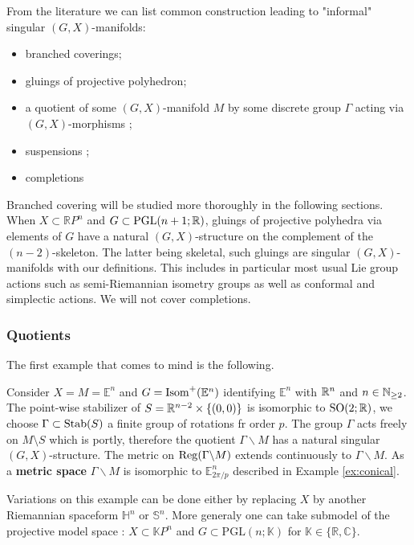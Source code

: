 From the literature we can list common construction leading to "informal" singular $(G,X)$-manifolds:
\begin{itemize}

 \item branched coverings;
 \item gluings of projective polyhedron; \cite{MR2127379,MR2170277,Particules_2,brunswic2021cauchy,spinexp}
  \item a quotient of some $(G,X)$-manifold $M$ by some discrete group $\Gamma$ acting via $(G,X)$-morphisms \cite{MR1177168};
 \item suspensions \cite{MR1668340,Particules_1};
 \item completions \cite{brunswic2021cauchy} 
\end{itemize}

Branched covering will be studied more thoroughly in the following sections. When $X\subset \mathbb RP^n$ and $G\subset \mathrm{PGL}(n+1; \mathbb R)$, gluings of projective polyhedra via elements of $G$ have a natural $(G,X)$-structure on the complement of the $(n-2)$-skeleton. The latter being skeletal, such gluings are singular $(G,X)$-manifolds with our definitions. This includes in particular most usual Lie group actions such as semi-Riemannian isometry groups as well as conformal and simplectic actions. We will not cover completions.

\subsubsection{Quotients}
The first example that comes to mind is the following.
\begin{ex}\label{ex:consider_identifying_point_wise_stabilizer} 
  Consider $X=M = \mathbb E^n$ and $G=\mathrm{Isom}^+(\mathbb E^n)$ identifying $\mathbb E^n$ with $\mathbb R^n$ and $n\in \mathbb{N}_{\geq 2}$. The point-wise stabilizer of $S = \mathbb R^{n-2}\times \{(0,0)\}$ is isomorphic to $\mathrm {SO}(2;\mathbb R)$,  we choose $\Gamma \subset \mathrm{Stab}(S)$ a finite group of rotations fr order $p$.
 The group $\Gamma$ acts freely on $M\setminus S$ which is portly, therefore the quotient $\Gamma \backslash M$ has a natural singular $(G,X)$-structure. 
 The metric on $\mathrm{Reg}(\Gamma\backslash M)$ extends continuously to $\Gamma\backslash M$. As a \textbf{metric space} $\Gamma \backslash M$ is isomorphic to $\mathbb E^n_ {2\pi/p}$ described in Example \ref{ex:conical}.
 
  Variations on this example can be done either by replacing $X$ by another Riemannian spaceform $\mathbb H^n$ or $\mathbb S^n$. More generaly one can take submodel of the projective model space :
 $X \subset \mathbb K P^n$ and $G \subset \mathrm{PGL}(n;\mathbb K)$ for $\mathbb K \in \{\mathbb R,\mathbb C\}$.
\end{ex}

